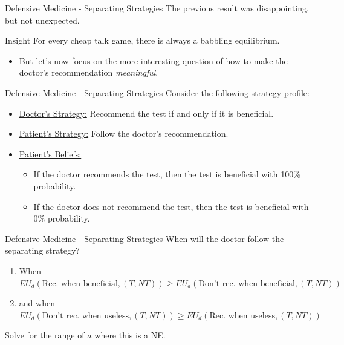 
\begin{frame}{Defensive Medicine - Separating Strategies}
  The previous result was disappointing, but not unexpected.
  \begin{block}{Insight}
    For every cheap talk game, there is always a babbling equilibrium.
  \end{block}
  \begin{itemize}
    \item But let's now focus on the more interesting question
    of how to make the doctor's recommendation \textit{meaningful}.
  \end{itemize}
\end{frame}


\begin{frame}{Defensive Medicine - Separating Strategies}
  Consider the following strategy profile:
  \begin{block}{}
    \begin{itemize}
      \item \underline{Doctor's Strategy:}
      Recommend the test if and only if it is beneficial.
      \item \underline{Patient's Strategy:}
      Follow the doctor's recommendation.
      \item \underline{Patient's Beliefs:}
      \begin{itemize}
        \item If the doctor recommends the test,
        then the test is beneficial with 100\% probability.
        \item If the doctor does not recommend the test,
        then the test is beneficial with 0\% probability.
      \end{itemize}
    \end{itemize}
  \end{block}
\end{frame}


\begin{frame}{Defensive Medicine - Separating Strategies}
  When will the doctor follow the separating strategy?
  \begin{enumerate}
    \item When 
    $EU_d(\text{Rec. when beneficial}, (T,NT)) 
    \geq EU_d(\text{Don't rec. when beneficial}, (T,NT))$ 
    \vspace{12mm}
    \item and when 
    $EU_d(\text{Don't rec. when useless}, (T,NT)) 
    \geq EU_d(\text{Rec. when useless}, (T,NT))$ 
    \vspace{12mm}
  \end{enumerate}
  Solve for the range of $a$ where this is a NE.  
\end{frame}

